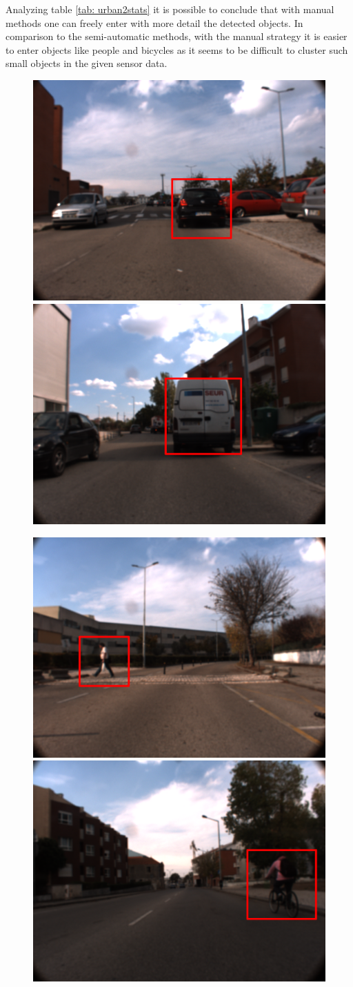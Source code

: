Analyzing table \ref{tab: urban2stats} it is possible to conclude that with manual methods one can freely enter with more detail the detected objects. In comparison to the semi-automatic methods, with the manual strategy it is easier to enter objects like people and bicycles as it seems to be difficult to cluster such small objects in the given sensor data.

\begin{figure}[htp]
	
	\centering
	
	\includegraphics[width=.49\textwidth]{capresults/imgs/car3.png}
	\includegraphics[width=.49\textwidth]{capresults/imgs/van3.png}
	
	\includegraphics[width=.49\textwidth]{capresults/imgs/people3.png}
	\includegraphics[width=.49\textwidth]{capresults/imgs/bicycle3.png}
	

\end{figure}
